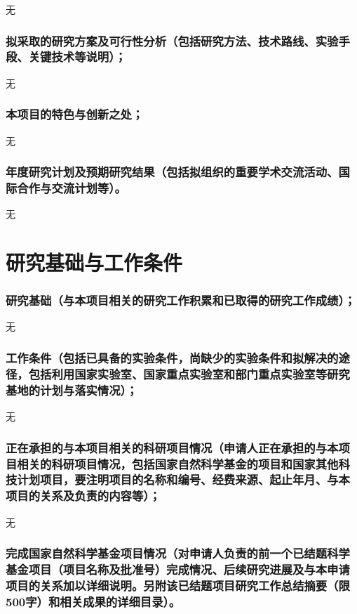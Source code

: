 \documentclass{article}
\begin{document}
无

\section[拟采取的研究方案及可行性分析]
{\textbf{拟采取的研究方案及可行性分析}（包括研究方法、技术路线、实验手段、关键技术等说明）；}

无

\section{\textbf{本项目的特色与创新之处；}}

无

\section[年度研究计划及预期研究结果]
{\textbf{年度研究计划及预期研究结果}（包括拟组织的重要学术交流活动、国际合作与交流计划等）。}

无

\part{\textbf{研究基础与工作条件}}

\section[研究基础]
{\textbf{研究基础}（与本项目相关的研究工作积累和已取得的研究工作成绩）；}

无

\section[工作条件]
{\textbf{工作条件}（包括已具备的实验条件，尚缺少的实验条件和拟解决的途径，包括利用国家实验室、国家重点实验室和部门重点实验室等研究基地的计划与落实情况）；}

无

\section[正在承担的与本项目相关的科研项目情况]
{\textbf{正在承担的与本项目相关的科研项目情况}（申请人正在承担的与本项目相关的科研项目情况，包括国家自然科学基金的项目和国家其他科技计划项目，要注明项目的名称和编号、经费来源、起止年月、与本项目的关系及负责的内容等）；}

无

\section[完成国家自然科学基金项目情况]
{\textbf{完成国家自然科学基金项目情况}（对申请人负责的前一个已结题科学基金项目（项目名称及批准号）完成情况、后续研究进展及与本申请项目的关系加以详细说明。另附该已结题项目研究工作总结摘要（限500字）和相关成果的详细目录）。}
\end{document}
